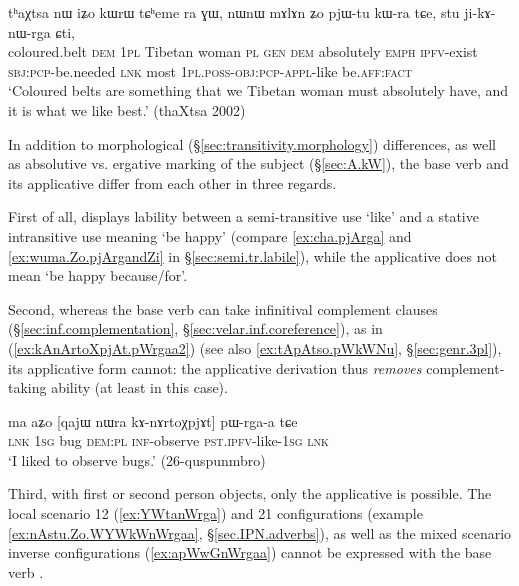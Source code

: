 \begin{exe}
\ex \label{ex:stu.jikAnWrga.Cti}
\gll tʰaχtsa nɯ iʑo kɯrɯ tɕʰeme ra ɣɯ, nɯnɯ mɤlɤn ʑo pjɯ-tu kɯ-ra tɕe, stu ji-kɤ-nɯ-rga ɕti, \\
coloured.belt \textsc{dem} \textsc{1pl} Tibetan woman \textsc{pl} \textsc{gen} \textsc{dem} absolutely \textsc{emph} \textsc{ipfv}-exist \textsc{sbj}:\textsc{pcp}-be.needed \textsc{lnk} most \textsc{1pl}.\textsc{poss}-\textsc{obj}:\textsc{pcp}-\textsc{appl}-like be.\textsc{aff}:\textsc{fact} \\
\glt `Coloured belts are something that we Tibetan woman must absolutely have, and it is what we like best.' (thaXtsa 2002)
\end{exe}

In addition to morphological (§\ref{sec:transitivity.morphology}) differences, as well as absolutive vs. ergative marking of the subject (§\ref{sec:A.kW}), the base verb  and its applicative  differ from each other in three regards.
 

First of all,  displays lability between a semi-transitive use `like' and a stative intransitive use meaning `be happy' (compare \ref{ex:cha.pjArga} and \ref{ex:wuma.Zo.pjArgandZi} in §\ref{sec:semi.tr.labile}), while the applicative  does not mean `be happy because/for'.

Second, whereas the base verb  can take infinitival complement clauses (§\ref{sec:inf.complementation}, §\ref{sec:velar.inf.coreference}), as in (\ref{ex:kAnArtoXpjAt.pWrgaa2}) (see also \ref{ex:tApAtso.pWkWNu}, §\ref{sec:genr.3pl}), its applicative form  cannot: the applicative derivation thus \textit{removes} com\-ple\-ment-taking ability (at least in this case).

\begin{exe}
\ex \label{ex:kAnArtoXpjAt.pWrgaa2}
\gll ma aʑo [qajɯ nɯra kɤ-nɤrtoχpjɤt] pɯ-rga-a tɕe  \\
\textsc{lnk} \textsc{1sg} bug \textsc{dem}:\textsc{pl} \textsc{inf}-observe \textsc{pst}.\textsc{ipfv}-like-\textsc{1sg} \textsc{lnk} \\
\glt `I liked to observe bugs.' (26-quspunmbro)
\end{exe}

Third, with first or second person objects, only the applicative  is possible. The local scenario 1\fl{}2 (\ref{ex:YWtanWrga}) and 2\fl{}1 configurations (example \ref{ex:nAstu.Zo.WYWkWnWrgaa}, §\ref{sec.IPN.adverbs}), as well as the mixed scenario inverse configurations (\ref{ex:apWwGnWrgaa}) cannot be expressed with the base verb . 


